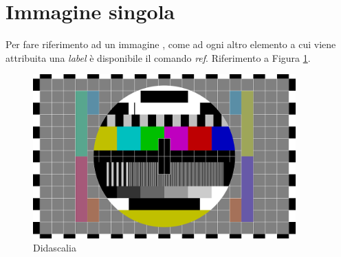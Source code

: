 \section{Immagine singola}

Per fare riferimento ad un immagine \cite{dirac}, come ad ogni altro elemento a cui viene attribuita una \textit{label} è disponibile il comando \textit{ref}. Riferimento a Figura \ref{fig:figura_test}.
\begin{figure}[!ht]
    \centering
    \includegraphics[width=0.9\textwidth]{images/cap2/test}
    \caption{Didascalia}
    \label{fig:figura_test}
\end{figure}